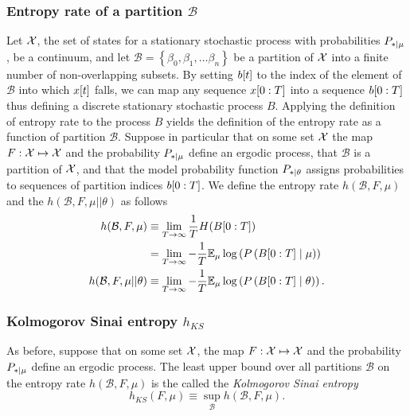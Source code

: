 \subsubsection{Entropy rate of a partition $\mathcal{B}$}
 Let ${\cal X}$, the set of states for a
stationary stochastic process with probabilities $P_{*\mid \mu}$, be a
continuum, and let $\mathcal{B} = \left\{ \beta_0,\beta_1,\ldots
  \beta_n \right\}$ be a partition of ${\cal X}$ into a finite number
of non-overlapping subsets.  By setting ${b}{[t]}$ to the index of
the element of $\mathcal{B}$ into which ${x}{[t]}$ falls, we can map
any sequence $x[0:T]$ into a sequence $b[0:T]$ thus
defining a discrete stationary stochastic process $B$.  Applying the
definition of entropy rate to the process $B$ yields the definition of
the entropy rate as a function of partition $\mathcal{B}$.  Suppose in
particular that on some set ${\cal X}$ the map $F:{\cal X}\mapsto{\cal
  X}$ and the probability $P_{*\mid \mu}$ define an ergodic process, that
$\mathcal{B}$ is a partition of ${\cal X}$, and that the model
probability function $P_{*\mid \theta}$ assigns probabilities to sequences
of partition indices $b[0:T]$.  We define the entropy rate $
h(\mathcal{B},F,\mu)$ and the  %
$h(\mathcal{B},F,\mu||\theta)$ as follows
\begin{align}
  \label{eq:hrate6}
  h(\mathcal{B},F,\mu) &\equiv \lim_{T \rightarrow \infty} \frac{1}{T}
  H(B[0:T]) \\
  &= \lim_{T \rightarrow \infty} -\frac{1}{T} \mathbb{E}_\mu \log\left(P
  \left(B[0:T]\mid  \mu \right) \right) \nonumber\\
  \label{eq:hrate7}
  h(\mathcal{B},F,\mu||\theta) &\equiv \lim_{T \rightarrow \infty}
  -\frac{1}{T} \mathbb{E}_\mu \log\left(P \left(B[0:T] \mid  \theta \right)
  \right). \nonumber  
\end{align}
\subsubsection{Kolmogorov Sinai entropy $h_{KS}$}
%
%
%
As before, suppose that on some set ${\cal X}$, the map $F:{\cal
  X}\mapsto{\cal X}$ and the probability $P_{*\mid \mu}$ define an ergodic
process.  The least upper bound over all partitions $\mathcal{B}$ on
the entropy rate $h(\mathcal{B},F,\mu)$ is the called the
\emph{Kolmogorov Sinai entropy}
\begin{equation}
  \label{eq:hKS}
  h_{KS}(F,\mu) \equiv \sup_{\mathcal{B}} h(\mathcal{B},F,\mu).
\end{equation}

